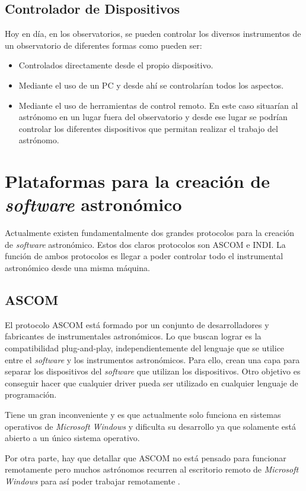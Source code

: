 \subsection{Controlador de Dispositivos}
Hoy en día, en los observatorios, se pueden controlar los diversos instrumentos de un observatorio de diferentes formas como pueden ser:

  \begin{itemize}
    \item Controlados directamente desde el propio dispositivo.
    \item Mediante el uso de un PC y desde ahí se controlarían todos los aspectos.
    \item Mediante el uso de herramientas de control remoto. En este caso situarían al astrónomo en un lugar fuera del observatorio y desde ese lugar se podrían controlar los diferentes dispositivos que permitan realizar el trabajo del astrónomo.
  \end{itemize}


\section{Plataformas para la creación de \textit{software} astronómico}
Actualmente existen fundamentalmente dos grandes protocolos para la creación de \textit{software} astronómico. Estos dos claros protocolos son ASCOM e INDI.  La función de ambos protocolos es llegar a poder controlar  todo el instrumental astronómico desde una misma máquina.

\subsection{ASCOM}
El protocolo ASCOM está formado por un conjunto de desarrolladores y fabricantes de instrumentales astronómicos. Lo que buscan lograr es la compatibilidad plug-and-play, independientemente del lenguaje que se utilice entre el \textit{software} y los instrumentos astronómicos. Para ello, crean una capa para separar los dispositivos del \textit{software} que utilizan los dispositivos. Otro objetivo es conseguir hacer que cualquier driver pueda ser utilizado en cualquier lenguaje de programación.

Tiene un gran inconveniente y es que actualmente solo funciona en sistemas operativos de \textit{Microsoft Windows} y dificulta su desarrollo ya que solamente está abierto a un único sistema operativo.

Por otra parte, hay que detallar que ASCOM no está pensado para funcionar remotamente pero muchos astrónomos recurren al escritorio remoto de \textit{Microsoft Windows} para así poder trabajar remotamente \cite{ASCOM}.


